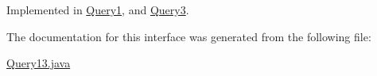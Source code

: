 Implemented in \hyperlink{classQuery1_a4ac5185895a11f7dd7906a22d8854caf}{Query1}, and \hyperlink{classQuery3_a6cde68ceca0e88d2af13e31a5de0e9a4}{Query3}.



The documentation for this interface was generated from the following file\+:\begin{DoxyCompactItemize}
\item 
\hyperlink{Query13_8java}{Query13.\+java}\end{DoxyCompactItemize}
